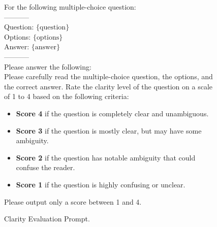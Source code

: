 \begin{figure}[h]
\centering
\begin{tcolorbox}[width=1\columnwidth, fontupper=\footnotesize,title=Clarity Evaluation Prompt]
\RaggedRight
\obeylines
{For the following multiple-choice question:\\
-----------\\
Question: $\{\text{question}\}$\\
\vspace{3mm}
Options: $\{\text{options}\}$\\
\vspace{3mm}
Answer: $\{\text{answer}\}$\\
-----------\\
Please answer the following:\\

Please carefully read the multiple-choice question, the options, and the correct answer.  
Rate the clarity level of the question on a scale of 1 to 4 based on the following criteria:
\begin{itemize}[label=-,nosep]
    \item \textbf{Score 4} if the question is completely clear and unambiguous.
    \item \textbf{Score 3} if the question is mostly clear, but may have some ambiguity.
    \item \textbf{Score 2} if the question has notable ambiguity that could confuse the reader.
    \item \textbf{Score 1} if the question is highly confusing or unclear.
\end{itemize}

Please output only a score between 1 and 4.
}

\end{tcolorbox}
\caption{Clarity Evaluation Prompt.}
\label{fig:clarity_prompt}
\end{figure}



